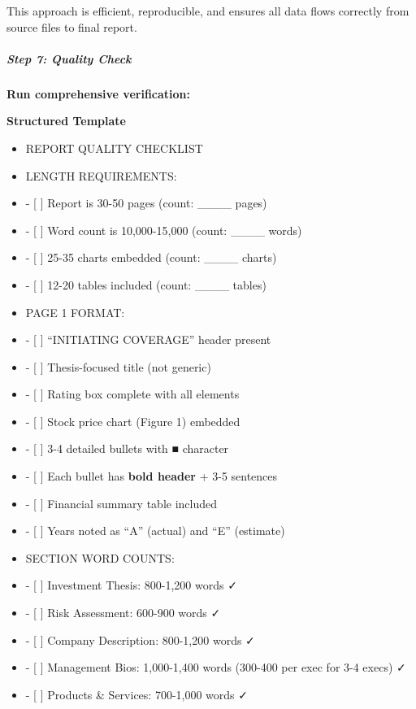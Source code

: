 \documentclass[11pt]{article}
\begin{document}
This approach is efficient, reproducible, and ensures all data flows correctly from source files to final report.


\subparagraph{Step 7: Quality Check}\mbox{}\par

\textbf{Run comprehensive verification:}


\textbf{Structured Template}
\begin{itemize}[leftmargin=*,itemsep=2pt,topsep=2pt]
\item {} REPORT QUALITY CHECKLIST
\item {} LENGTH REQUIREMENTS:
\item {} - [ ] Report is 30-50 pages (count: \_\allowbreak{}\_\allowbreak{}\_\allowbreak{}\_\allowbreak{} pages)
\item {} - [ ] Word count is 10,000-15,000 (count: \_\allowbreak{}\_\allowbreak{}\_\allowbreak{}\_\allowbreak{} words)
\item {} - [ ] 25-35 charts embedded (count: \_\allowbreak{}\_\allowbreak{}\_\allowbreak{}\_\allowbreak{} charts)
\item {} - [ ] 12-20 tables included (count: \_\allowbreak{}\_\allowbreak{}\_\allowbreak{}\_\allowbreak{} tables)
\item {} PAGE 1 FORMAT:
\item {} - [ ] ``INITIATING COVERAGE'' header present
\item {} - [ ] Thesis-focused title (not generic)
\item {} - [ ] Rating box complete with all elements
\item {} - [ ] Stock price chart (Figure 1) embedded
\item {} - [ ] 3-4 detailed bullets with ■ character
\item {} - [ ] Each bullet has \textbf{bold header} + 3-5 sentences
\item {} - [ ] Financial summary table included
\item {} - [ ] Years noted as ``A'' (actual) and ``E'' (estimate)
\item {} SECTION WORD COUNTS:
\item {} - [ ] Investment Thesis: 800-1,200 words ✓
\item {} - [ ] Risk Assessment: 600-900 words ✓
\item {} - [ ] Company Description: 800-1,200 words ✓
\item {} - [ ] Management Bios: 1,000-1,400 words (300-400 per exec for 3-4 execs) ✓
\item {} - [ ] Products \& Services: 700-1,000 words ✓

\end{itemize}
\end{document}
